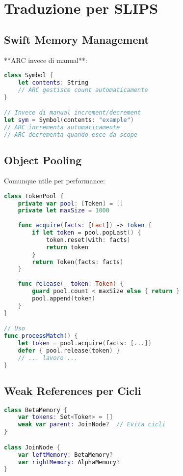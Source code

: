 \section{Traduzione per SLIPS}

\subsection{Swift Memory Management}

**ARC invece di manual**:

\begin{lstlisting}[language=Swift]
class Symbol {
    let contents: String
    // ARC gestisce count automaticamente
}

// Invece di manual increment/decrement
let sym = Symbol(contents: "example")
// ARC incrementa automaticamente
// ARC decrementa quando esce da scope
\end{lstlisting}

\subsection{Object Pooling}

Comunque utile per performance:

\begin{lstlisting}[language=Swift]
class TokenPool {
    private var pool: [Token] = []
    private let maxSize = 1000
    
    func acquire(facts: [Fact]) -> Token {
        if let token = pool.popLast() {
            token.reset(with: facts)
            return token
        }
        return Token(facts: facts)
    }
    
    func release(_ token: Token) {
        guard pool.count < maxSize else { return }
        pool.append(token)
    }
}

// Uso
func processMatch() {
    let token = pool.acquire(facts: [...])
    defer { pool.release(token) }
    // ... lavoro ...
}
\end{lstlisting}

\subsection{Weak References per Cicli}

\begin{lstlisting}[language=Swift]
class BetaMemory {
    var tokens: Set<Token> = []
    weak var parent: JoinNode?  // Evita cicli
}

class JoinNode {
    var leftMemory: BetaMemory?
    var rightMemory: AlphaMemory?
}
\end{lstlisting}

